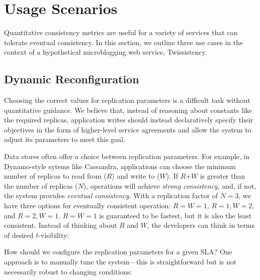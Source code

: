 \section{Usage Scenarios}
\label{sec:scenarios}

Quantitative consistency metrics are useful for a variety of services
that can tolerate eventual consistency. In this section, we outline
three use cases in the context of a hypothetical microblogging web
service, Twissistency.

\subsection{Dynamic Reconfiguration}
\label{sec:dynamic}

Choosing the correct values for replication parameters is a difficult
task without quantitative guidance. We believe that, instead of
reasoning about constants like the required replicas, application
writes should instead declaratively specify their objectives in the
form of higher-level service agreements and allow the system to adjust
its parameters to meet this goal.

Data stores often offer a choice between replication parameters. For
example, in Dynamo-style sytems like Cassandra, applications can
choose the minimum number of replicas to read from ($R$) and write to
($W$). If $R$+$W$ is greater than the number of replicas ($N$),
operations will achieve \textit{strong consistency}, and, if not, the
system provides \textit{eventual consistency}. With a replication
factor of $N=3$, we have three options for eventually consistent
operation: $R$$=$$W$$=$$1$, $R$$=$$1$$, W$$=$$2$, and $R$$=$$2$$,
W$$=$$1$.  $R$$=$$W$$=$$1$ is guaranteed to be fastest, but it is also
the least consistent. Instead of thinking about $R$ and $W$, the
developers can think in terms of desired $t$-visibility:


How should we configure the replication parameters for a given SLA?
One approach is to manually tune the system---this is straightforward
but is not necessarily robust to changing conditions:


